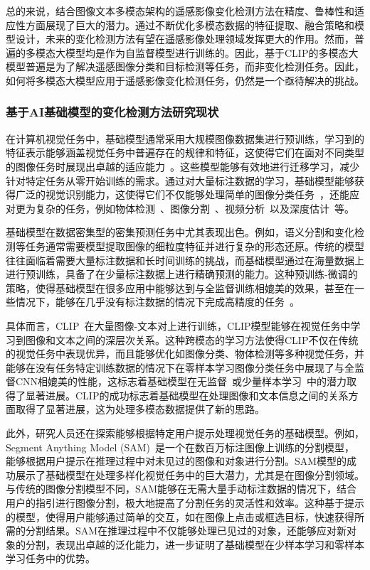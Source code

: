总的来说，结合图像文本多模态架构的遥感影像变化检测方法在精度、鲁棒性和适应性方面展现了巨大的潜力。通过不断优化多模态数据的特征提取、融合策略和模型设计，未来的变化检测方法有望在遥感影像处理领域发挥更大的作用。然而，普遍的多模态大模型均是作为自监督模型进行训练的。因此，基于CLIP的多模态大模型普遍是为了解决遥感图像分类和目标检测等任务，而非变化检测任务。因此，如何将多模态大模型应用于遥感影像变化检测任务，仍然是一个亟待解决的挑战。

\subsubsection{基于AI基础模型的变化检测方法研究现状}
在计算机视觉任务中，基础模型通常采用大规模图像数据集进行预训练，学习到的特征表示能够涵盖视觉任务中普遍存在的规律和特征，这使得它们在面对不同类型的图像任务时展现出卓越的适应能力~\cite{Wang2024HyperSIGMAHI}。这些模型能够有效地进行迁移学习，减少针对特定任务从零开始训练的需求。通过对大量标注数据的学习，基础模型能够获得广泛的视觉识别能力，这使得它们不仅能够处理简单的图像分类任务~\cite{Radford2021LearningTV}，还能应对更为复杂的任务，例如物体检测~\cite{Liu2023GroundingDM}、图像分割~\cite{Kirillov2023SegmentA}、视频分析~\cite{Lou2024ZeroshotST}以及深度估计~\cite{Yang2024DepthAU}等。

基础模型在数据密集型的密集预测任务中尤其表现出色。例如，语义分割和变化检测等任务通常需要模型提取图像的细粒度特征并进行复杂的形态还原。传统的模型往往面临着需要大量标注数据和长时间训练的挑战，而基础模型通过在海量数据上进行预训练，具备了在少量标注数据上进行精确预测的能力。这种预训练-微调的策略，使得基础模型在很多应用中能够达到与全监督训练相媲美的效果，甚至在一些情况下，能够在几乎没有标注数据的情况下完成高精度的任务~\cite{Julka2023KnowledgeDW,Wu2023MedicalSA,Osco2023TheSA}。

具体而言，CLIP~\cite{Radford2021LearningTV}在大量图像-文本对上进行训练，CLIP模型能够在视觉任务中学习到图像和文本之间的深层次关系。这种跨模态的学习方法使得CLIP不仅在传统的视觉任务中表现优异，而且能够优化如图像分类、物体检测等多种视觉任务，并能够在没有任务特定训练数据的情况下在零样本学习图像分类任务中展现了与全监督CNN相媲美的性能，这标志着基础模型在无监督~\cite{Abdelfattah2023CDULCU}或少量样本学习~\cite{Singha2023APPLeNetVA}中的潜力取得了显著进展。CLIP的成功标志着基础模型在处理图像和文本信息之间的关系方面取得了显著进展，这为处理多模态数据提供了新的思路。

此外，研究人员还在探索能够根据特定用户提示处理视觉任务的基础模型。例如，Segment Anything Model (SAM)~\cite{Kirillov2023SegmentA}是一个在数百万标注图像上训练的分割模型，能够根据用户提示在推理过程中对未见过的图像和对象进行分割。SAM模型的成功展示了基础模型在处理多样化视觉任务中的巨大潜力，尤其是在图像分割领域。与传统的图像分割模型不同，SAM能够在无需大量手动标注数据的情况下，结合用户的指引进行图像分割，极大地提高了分割任务的灵活性和效率。这种基于提示的模型，使得用户能够通过简单的交互，如在图像上点击或框选目标，快速获得所需的分割结果。SAM在推理过程中不仅能够处理已见过的对象，还能够应对新对象的分割，表现出卓越的泛化能力，进一步证明了基础模型在少样本学习和零样本学习任务中的优势。

